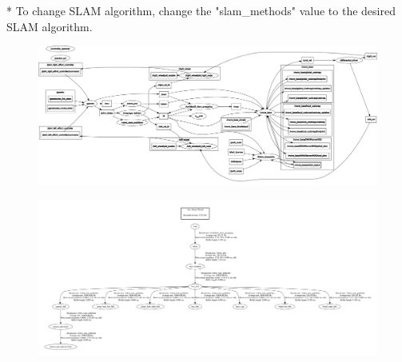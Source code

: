 \documentclass[12]{article}
\begin{document}
  * To change SLAM algorithm, change the "slam\_methods" value to the desired SLAM algorithm.
  

\begin{landscape}
\newpage
\begin{figure}
    \centering
    \includegraphics[width=\columnwidth]{images/rosgraph.png}
\end{figure}
\end{landscape}
\begin{landscape}
\newpage
\begin{figure}
    \centering
    \includegraphics[width=\columnwidth]{images/frames-1.png}
\end{figure}

\end{landscape}
\end{document}
